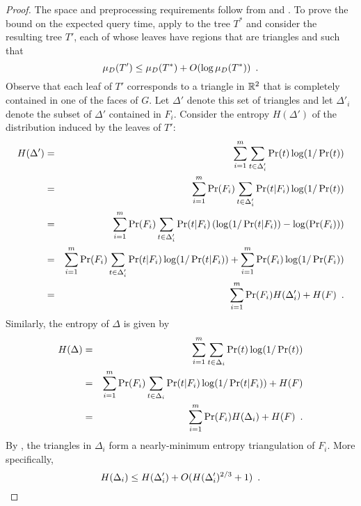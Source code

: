 \documentclass[lotsofwhite]{patmorin}
\begin{document}
\begin{proof}
The space and preprocessing requirements follow from
 and .
To prove the bound on the expected query time, apply
 to the tree $T^*$ and consider the resulting tree
$T'$, each of whose leaves have regions that are triangles and such
that
\begin{equation}
     \mu_D(T') \le \mu_D(T^*) + O(\log \mu_D(T^*)) \enspace .
       \eqlabel{t-triangle}
\end{equation}
Observe that each leaf of $T'$ corresponds to a triangle in $\mathbb{R}^2$
that is completely contained in one of the faces of $G$.  Let
$\Delta'$ denote this set of triangles and let $\Delta'_i$ denote the
subset of $\Delta'$ contained in $F_i$.
Consider the entropy $H(\Delta')$ of the distribution induced by the
leaves of $T'$:
\begin{eqnarray*}
   H(\Delta') 
     & = & \sum_{i=1}^m \sum_{t\in \Delta'_i}\Pr(t)\log(1/\Pr(t)) \\
     & = & \sum_{i=1}^m \Pr(F_i)\sum_{t\in \Delta'_i}
            \Pr(t|F_i)\log(1/\Pr(t)) \\
     & = & \sum_{i=1}^m \Pr(F_i)\sum_{t\in \Delta'_i}
            \Pr(t|F_i)
            \left(
              \log(1/\Pr(t|F_i))-\log(\Pr(F_i))
            \right) \\
     & = & \sum_{i=1}^m \Pr(F_i)\sum_{t\in \Delta'_i}
            \Pr(t|F_i)\log(1/\Pr(t|F_i)) 
             + \sum_{i=1}^m \Pr(F_i) \log(1/\Pr(F_i)) \\
     & = & \sum_{i=1}^m \Pr(F_i) H(\Delta'_i) + H(F) \enspace .
      \eqlabel{h-delta-prime}
\end{eqnarray*}
Similarly, the entropy of $\Delta$ is given by 
\begin{eqnarray*}
   H(\Delta) 
     & = & \sum_{i=1}^m \sum_{t\in \Delta_i}\Pr(t)\log(1/\Pr(t)) \\
     & = & \sum_{i=1}^m \Pr(F_i)\sum_{t\in \Delta_i}
            \Pr(t|F_i)\log(1/\Pr(t|F_i)) 
          + H(F) \\
     & = & \sum_{i=1}^m \Pr(F_i) H(\Delta_i) + H(F) \enspace .
      \eqlabel{h-delta}
\end{eqnarray*}
By , the triangles in $\Delta_i$ form a
nearly-minimum entropy triangulation of $F_i$.  More specifically, 
\begin{equation}
   H(\Delta_i) \le H(\Delta'_i) + O(H(\Delta'_i)^{2/3}+1)  \enspace .
    \eqlabel{h-delta-i}
\end{equation}

\end{proof}
\end{document}
